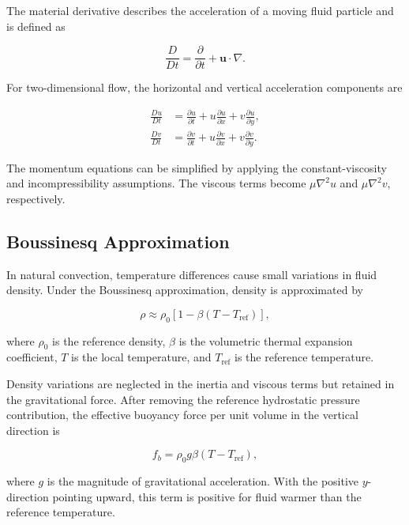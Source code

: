 \documentclass{article}
\begin{document}
The material derivative describes the acceleration of a
moving fluid particle and is defined as

\begin{equation}
\frac{D}{Dt}
=\frac{\partial}{\partial t}
+\mathbf{u}\cdot\nabla.
\end{equation}

For two-dimensional flow, the horizontal and vertical
acceleration components are

\begin{align}
\frac{Du}{Dt}
&=\frac{\partial u}{\partial t}
+u\frac{\partial u}{\partial x}
+v\frac{\partial u}{\partial y},
\\
\frac{Dv}{Dt}
&=\frac{\partial v}{\partial t}
+u\frac{\partial v}{\partial x}
+v\frac{\partial v}{\partial y}.
\end{align}

The momentum equations can be simplified by applying the
constant-viscosity and incompressibility assumptions. The
viscous terms become $\mu\nabla^2u$ and $\mu\nabla^2v$,
respectively.

\subsection{Boussinesq Approximation}

In natural convection, temperature differences cause small
variations in fluid density. Under the Boussinesq approximation,
density is approximated by

\begin{equation}
\rho\approx\rho_0
\left[1-\beta(T-T_{\mathrm{ref}})\right],
\label{eq:density}
\end{equation}

where $\rho_0$ is the reference density, $\beta$ is the
volumetric thermal expansion coefficient, $T$ is the local
temperature, and $T_{\mathrm{ref}}$ is the reference
temperature.

Density variations are neglected in the inertia and viscous
terms but retained in the gravitational force. After removing
the reference hydrostatic pressure contribution, the effective
buoyancy force per unit volume in the vertical direction is

\begin{equation}
f_b=\rho_0g\beta(T-T_{\mathrm{ref}}),
\label{eq:buoyancy}
\end{equation}

where $g$ is the magnitude of gravitational acceleration.
With the positive $y$-direction pointing upward, this term
is positive for fluid warmer than the reference temperature.
\end{document}

